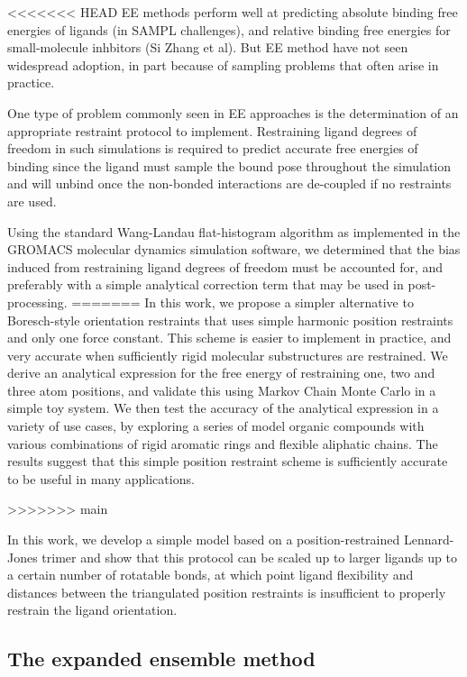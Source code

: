 \documentclass[%
 aip,
rsi,%
 amsmath,amssymb,
 reprint,%
]{revtex4-1}
\begin{document}
<<<<<<< HEAD
EE methods perform well at predicting absolute binding free energies of ligands (in SAMPL challenges), and relative binding free energies for small-molecule inhbitors (Si Zhang et al).   But EE method have not seen widespread adoption, in part because of sampling problems that often arise in practice.

One type of problem commonly seen in EE approaches is the determination of an appropriate restraint protocol to implement. Restraining ligand degrees of freedom in such simulations is required to predict accurate free energies of binding since the ligand must sample the bound pose throughout the simulation and will unbind once the non-bonded interactions are de-coupled if no restraints are used.

Using the standard Wang-Landau flat-histogram algorithm as implemented in the GROMACS molecular dynamics simulation software, we determined that the bias induced from restraining ligand degrees of freedom must be accounted for, and preferably with a simple analytical correction term that may be used in post-processing.
=======
In this work, we propose a simpler alternative to Boresch-style orientation restraints that uses simple harmonic position restraints and only one force constant.  This scheme is easier to implement in practice, and very accurate when sufficiently rigid molecular substructures are restrained.  We derive an analytical expression for the free energy of restraining one, two and three atom positions, and validate this using Markov Chain Monte Carlo in a simple toy system.  We then test the accuracy of the analytical expression in a variety of use cases, by exploring a series of model organic compounds with various combinations of rigid aromatic rings and flexible aliphatic chains.   The results suggest that this simple position restraint scheme is sufficiently accurate to be useful in many applications.



>>>>>>> main

In this work, we develop a simple model based on a position-restrained Lennard-Jones trimer and show that this protocol can be scaled up to larger ligands up to a certain number of rotatable bonds, at which point ligand flexibility and distances between the triangulated position restraints is insufficient to properly restrain the ligand orientation.

\subsection*{The expanded ensemble method}
\end{document}

